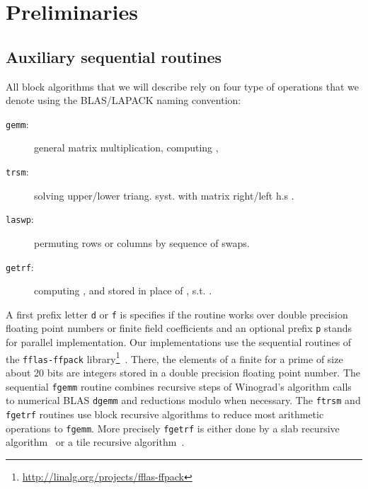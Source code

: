 \documentclass{article}
\newcommand{\gemm}{\texttt{gemm}\xspace}
\newcommand{\fgemm}{\texttt{fgemm}\xspace}
\newcommand{\dgemm}{\texttt{dgemm}\xspace}
\newcommand{\trsm}{\texttt{trsm}\xspace}
\newcommand{\ftrsm}{\texttt{ftrsm}\xspace}
\newcommand{\laswp}{\texttt{laswp}\xspace}
\newcommand{\getrf}{\texttt{getrf}\xspace}
\newcommand{\fgetrf}{\texttt{fgetrf}\xspace}
\newcommand{\fflasffpack}{\texttt{fflas-ffpack}\xspace}
\begin{document}
 

 
 
\section{Preliminaries}
 
\label{sec:prelim}

 
\subsection{Auxiliary sequential routines}

All block algorithms that we will describe rely on four type of operations that
we denote using the BLAS/LAPACK naming convention:
\vspace{-2mm}
\begin{description}
  \item[\gemm:] general matrix multiplication, computing ,
  \item[\trsm:] solving upper/lower triang. syst. with matrix right/left h.s .
  \item[\laswp:] permuting rows or columns by sequence of swaps. 
 
  \item[\getrf:] 
 
computing ,  and  stored in place
    of , s.t. .
\end{description}
\vspace{-2mm}

A first prefix letter \texttt{d} or \texttt{f} is specifies if the routine
works over double precision floating point numbers or finite field coefficients
and an optional prefix \texttt{p} stands for parallel implementation.
Our implementations use the sequential routines of the \fflasffpack
library\footnote{\url{http://linalg.org/projects/fflas-ffpack}}~\cite{DGP08}. There,
the elements of a finite  for a prime  of size about 20 bits
are integers stored in a double precision floating point number. The sequential
\fgemm routine combines recursive steps of Winograd's algorithm calls to
numerical BLAS \dgemm and reductions modulo  when necessary. The \ftrsm and
\fgetrf routines use block recursive algorithms to reduce most arithmetic
operations to \fgemm. More precisely \fgetrf is either done by a slab
recursive algorithm~\cite{DGP08} or a tile recursive algorithm~\cite{DPS13}.

 
 
 
 
 
 
 
 
 
 
\end{document}
